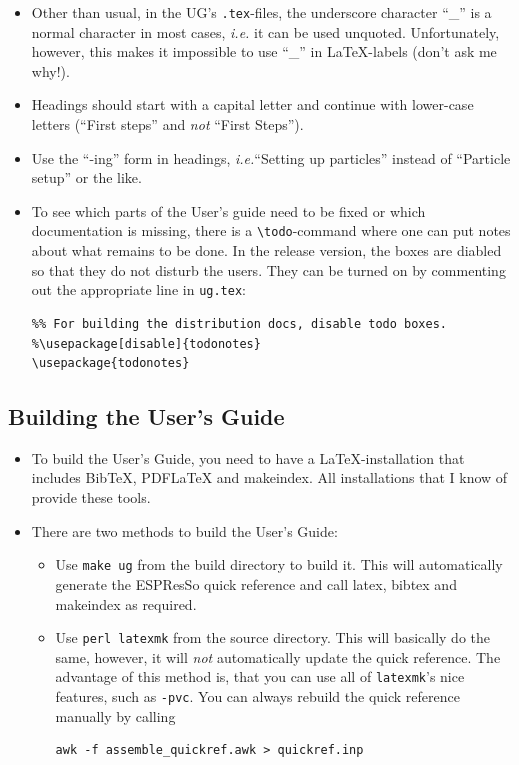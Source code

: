 \documentclass[
a4paper,                        %
11pt,                           %
twoside,                        %
footsepline,                    %
headsepline,                    %
headexclude,                    %
footexclude,                    %
pagesize,                       %
bibtotocnumbered,               %
idxtotoc                        %
]{scrartcl}
\newcommand{\es}{\mbox{\textsf{ESPResSo}}\xspace}
\newcommand{\ie}{\textit{i.e.}\xspace}
\begin{document}
\begin{itemize}
\item Other than usual, in the UG's \texttt{.tex}-files, the
  underscore character ``\_'' is a normal character in most cases, \ie
  it can be used unquoted. Unfortunately, however, this makes it
  impossible to use ``\_'' in \LaTeX-labels (don't ask me why!).
\item Headings should start with a capital letter and continue with
  lower-case letters (``First steps'' and \emph{not} ``First Steps'').
\item Use the ``-ing'' form in headings, \ie ``Setting up particles''
  instead of ``Particle setup'' or the like.
\item To see which parts of the User's guide need to be fixed or which
  documentation is missing, there is a \verb!\todo!-command where one
  can put notes about what remains to be done. In the release version,
  the boxes are diabled so that they do not disturb the users. They
  can be turned on by commenting out the appropriate line in
  \texttt{ug.tex}:
\begin{verbatim}
%% For building the distribution docs, disable todo boxes.
%\usepackage[disable]{todonotes}
\usepackage{todonotes}
\end{verbatim}

\end{itemize}

\subsection{Building the User's Guide}
\begin{itemize}
\item To build the User's Guide, you need to have a \LaTeX-installation
  that includes BibTeX, PDFLaTeX and makeindex. All installations that
  I know of provide these tools.
\item There are two methods to build the User's Guide:
  \begin{itemize}
  \item Use \texttt{make ug} from the build directory to build
    it. This will automatically generate the \es quick reference
    and call latex, bibtex and makeindex as required.
  \item Use \texttt{perl latexmk} from the source directory. This will
    basically do the same, however, it will \emph{not} automatically
    update the quick reference. The advantage of this method is, that
    you can use all of \texttt{latexmk}'s nice features, such as
    \texttt{-pvc}. You can always rebuild the quick reference manually
    by calling 
    \begin{verbatim}
awk -f assemble_quickref.awk > quickref.inp
    \end{verbatim}
  \end{itemize}
\end{itemize}
\end{document}
